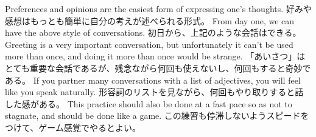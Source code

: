 \documentclass[uplatex,dvipdfmx,b5paper,english,10pt]{jsbook}
\begin{document}
\ifEnglish
Preferences and opinions are the easiest form of expressing one's thoughts.
\else
好みや感想はもっとも簡単に自分の考えが述べられる形式。
\fi
\ifEnglish
From day one, we can have the above style of conversations.
\else
初日から、上記のような会話はできる。
\fi
\ifEnglish
Greeting is a very important conversation, but unfortunately it can't be used more than once, and doing it more than once would be strange.
\else
「あいさつ」はとても重要な会話であるが、残念ながら何回も使えないし、何回もすると奇妙である。
\fi
\ifEnglish
If you partner many conversations with a list of adjectives, you will feel like you speak naturally.
\else
形容詞のリストを見ながら、何回もやり取りすると話した感がある。
\fi
\ifEnglish
This practice should also be done at a fast pace so as not to stagnate, and should be done like a game.
\else
この練習も停滞しないようスピードをつけて、ゲーム感覚でやるとよい。
\fi
\end{document}
